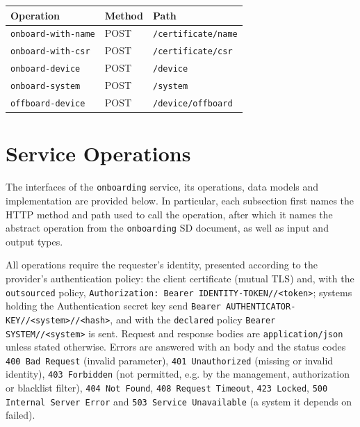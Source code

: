 \documentclass[a4paper]{arrowhead}
\newcommand{\mref}[2][]{{\textcolor{ArrowheadPurple}{\hyperref[sec:model:#2]{\ifstrempty{#1}{#2}{#1}}}}}
\begin{document}
\noindent\begin{longtable}{| p{5.2cm} | p{1.6cm} | p{8.4cm} |} \hline
\rowcolor{gray!33} Operation & Method & Path \\ \hline \endhead
\texttt{onboard-\allowbreak{}with-\allowbreak{}name} & POST & \texttt{/\allowbreak{}certificate/\allowbreak{}name} \\ \hline
\texttt{onboard-\allowbreak{}with-\allowbreak{}csr} & POST & \texttt{/\allowbreak{}certificate/\allowbreak{}csr} \\ \hline
\texttt{onboard-\allowbreak{}device} & POST & \texttt{/\allowbreak{}device} \\ \hline
\texttt{onboard-\allowbreak{}system} & POST & \texttt{/\allowbreak{}system} \\ \hline
\texttt{offboard-\allowbreak{}device} & POST & \texttt{/\allowbreak{}device/\allowbreak{}offboard} \\ \hline
\end{longtable}

\newpage

\section{Service Operations}
\label{sec:operations}

The interfaces of the \texttt{onboarding} service, its operations, data models and implementation are provided below.
In particular, each subsection first names the HTTP method and path used to call the operation, after which it names the abstract operation from the \texttt{onboarding} SD document, as well as input and output types.

All operations require the requester's identity, presented according to the provider's authentication policy: the client certificate (mutual TLS) and, with the \texttt{outsourced} policy, \texttt{Authorization: Bearer IDENTITY-TOKEN//<token>}; systems holding the Authentication secret key send \texttt{Bearer AUTHENTICATOR-KEY//<system>//<hash>}, and with the \texttt{declared} policy \texttt{Bearer SYSTEM//<system>} is sent. Request and response bodies are \texttt{application/json} unless stated otherwise.
Errors are answered with an \mref{ErrorMessage} body and the status codes \texttt{400 Bad Request} (invalid parameter), \texttt{401 Unauthorized} (missing or invalid identity), \texttt{403 Forbidden} (not permitted, e.g. by the management, authorization or blacklist filter), \texttt{404 Not Found}, \texttt{408 Request Timeout}, \texttt{423 Locked}, \texttt{500 Internal Server Error} and \texttt{503 Service Unavailable} (a system it depends on failed).
\end{document}
